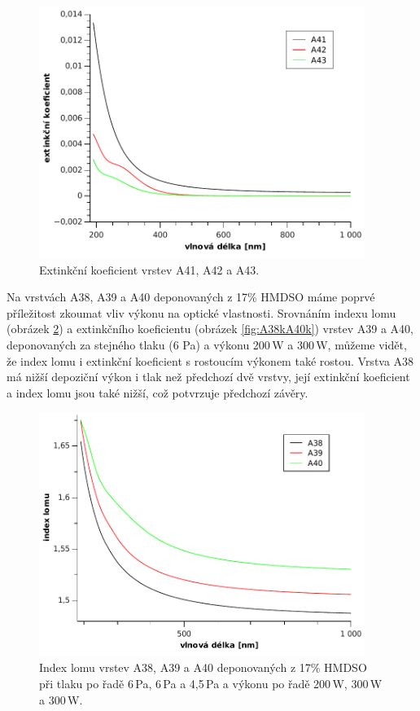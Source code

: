 \documentclass[12pt,oneside,final]{fithesis2}
\begin{document}
\begin{figure}[p]
  \centering
  \includegraphics[width=400px]{img/A41kA43k.pdf}
  \caption{Extinkční koeficient vrstev A41, A42 a A43.}
  \label{fig:A41kA43k}
\end{figure}

Na vrstvách A38, A39 a A40 deponovaných z 17\% HMDSO máme poprvé příležitost zkoumat vliv výkonu na optické vlastnosti. Srovnáním indexu lomu (obrázek \ref{fig:A38nA40n}) a extinkčního koeficientu (obrázek \ref{fig:A38kA40k}) vrstev A39 a A40, deponovaných za stejného tlaku (6 Pa) a výkonu 200\,W a 300\,W, můžeme vidět, že index lomu i extinkční koeficient s rostoucím výkonem také rostou. Vrstva A38 má nižší depoziční výkon i tlak než předchozí dvě vrstvy, její extinkční koeficient a index lomu jsou také nižší, což potvrzuje předchozí závěry.

\begin{figure}[p]
  \centering
  \includegraphics[width=400px]{img/A38nA40n.pdf}
  \caption{Index lomu vrstev A38, A39 a A40 deponovaných z 17\% HMDSO při tlaku po řadě 6\,Pa, 6\,Pa a 4,5\,Pa a výkonu po řadě 200\,W, 300\,W a 300\,W.}
  \label{fig:A38nA40n}
\end{figure}
\end{document}
